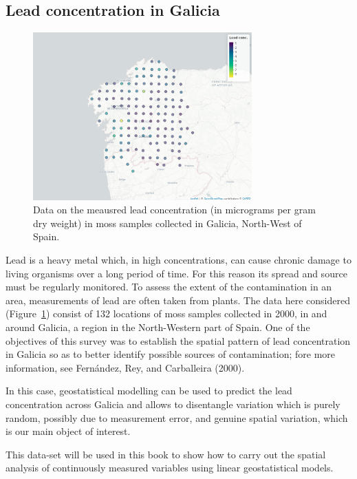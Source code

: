 \documentclass[
  letterpaper,
]{krantz}
\begin{document}
\hypertarget{lead-concentration-in-galicia}{%
\subsection{Lead concentration in
Galicia}\label{lead-concentration-in-galicia}}

\begin{figure}

{\centering \includegraphics[width=3.31in,height=\textheight]{./figures/galicia_ch1.png}

}

\caption{\label{fig-galicia-ch1}Data on the meausred lead concentration
(in micrograms per gram dry weight) in moss samples collected in
Galicia, North-West of Spain.}

\end{figure}

Lead is a heavy metal which, in high concentrations, can cause chronic
damage to living organisms over a long period of time. For this reason
its spread and source must be regularly monitored. To assess the extent
of the contamination in an area, measurements of lead are often taken
from plants. The data here considered (Figure~\ref{fig-galicia-ch1})
consist of 132 locations of moss samples collected in 2000, in and
around Galicia, a region in the North-Western part of Spain. One of the
objectives of this survey was to establish the spatial pattern of lead
concentration in Galicia so as to better identify possible sources of
contamination; fore more information, see Fernández, Rey, and
Carballeira (2000).

In this case, geostatistical modelling can be used to predict the lead
concentration across Galicia and allows to disentangle variation which
is purely random, possibly due to measurement error, and genuine spatial
variation, which is our main object of interest.

This data-set will be used in this book to show how to carry out the
spatial analysis of continuously measured variables using linear
geostatistical models.
\end{document}
